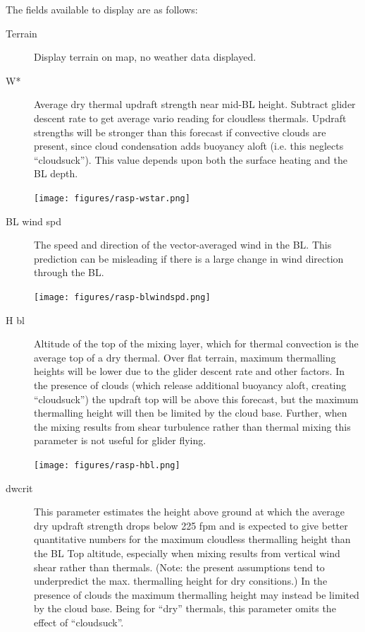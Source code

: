 The fields available to display are as follows:
\begin{description}
\item[Terrain] Display terrain on map, no weather data displayed.

\item[W*] 
Average dry thermal updraft strength near mid-BL height.  Subtract
glider descent rate to get average vario reading for cloudless
thermals.  Updraft strengths will be stronger than this forecast if
convective clouds are present, since cloud condensation adds buoyancy
aloft (i.e. this neglects ``cloudsuck'').  This value depends upon both
the surface heating and the BL depth.

\begin{center}
\texttt{[image: figures/rasp-wstar.png]}
\end{center}

\item[BL wind spd] 
The speed and direction of the vector-averaged wind in the BL.  This
prediction can be misleading if there is a large change in wind
direction through the BL.

\begin{center}
\texttt{[image: figures/rasp-blwindspd.png]}
\end{center}

\item[H bl]  
Altitude of the top of the mixing layer, which for thermal convection is
the average top of a dry thermal.  Over flat terrain, maximum
thermalling heights will be lower due to the glider descent rate and
other factors.  In the presence of clouds (which release additional
buoyancy aloft, creating ``cloudsuck'') the updraft top will be above
this forecast, but the maximum thermalling height will then be limited
by the cloud base.  Further, when the mixing results from shear
turbulence rather than thermal mixing this parameter is not useful for
glider flying.

\begin{center}
\texttt{[image: figures/rasp-hbl.png]}
\end{center}

\item[dwcrit]  
This parameter estimates the height above ground at which the average
dry updraft strength drops below 225 fpm and is expected to give
better quantitative numbers for the maximum cloudless thermalling
height than the BL Top altitude, especially when mixing results from
vertical wind shear rather than thermals.  (Note: the present
assumptions tend to underpredict the max. thermalling height for dry
consitions.) In the presence of clouds the maximum thermalling height
may instead be limited by the cloud base.  Being for ``dry'' thermals,
this parameter omits the effect of ``cloudsuck''.


\end{description}
